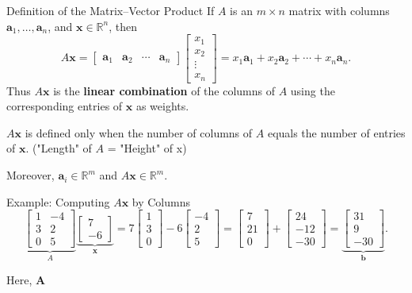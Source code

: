 \begin{frame}{Definition of the Matrix--Vector Product}
  If $A$ is an $m\times n$ matrix with columns
  $\mathbf{a}_1,\ldots,\mathbf{a}_n$, and
  $\mathbf{x}\in\mathbb{R}^n$, then
  \[
    A\mathbf{x}
    =\begin{bmatrix}\mathbf{a}_1&\mathbf{a}_2&\cdots&\mathbf{a}_n\end{bmatrix}
     \begin{bmatrix}x_1\\x_2\\\vdots\\x_n\end{bmatrix}
    =x_1\mathbf{a}_1+x_2\mathbf{a}_2+\cdots+x_n\mathbf{a}_n.
  \]
  Thus $A\mathbf{x}$ is the \textbf{linear combination} of the columns of $A$ using
  the corresponding entries of $\mathbf{x}$ as weights.

  \medskip
  $A\mathbf{x}$ is defined only when the number of columns of $A$ equals
  the number of entries of $\mathbf{x}$. ("Length" of $A$ = "Height" of x)
  
  Moreover,
  $\mathbf{a}_i\in\mathbb{R}^m$ and $A\mathbf{x}\in\mathbb{R}^m$.
\end{frame}

\begin{frame}{Example: Computing $A\mathbf{x}$ by Columns}
  \[
    \underbrace{\begin{bmatrix}1&-4\\3&2\\0&5\end{bmatrix}}_{A}
    \underbrace{\begin{bmatrix}7\\-6\end{bmatrix}}_{\mathbf{x}}
    =7\begin{bmatrix}1\\3\\0\end{bmatrix}
      -6\begin{bmatrix}-4\\2\\5\end{bmatrix}
    =\begin{bmatrix}7\\21\\0\end{bmatrix}
      +\begin{bmatrix}24\\-12\\-30\end{bmatrix}
    =\underbrace{\begin{bmatrix}31\\9\\-30\end{bmatrix}}_{\mathbf{b}}.
  \]

  Here, $\mathbf{A}$
\end{frame}


